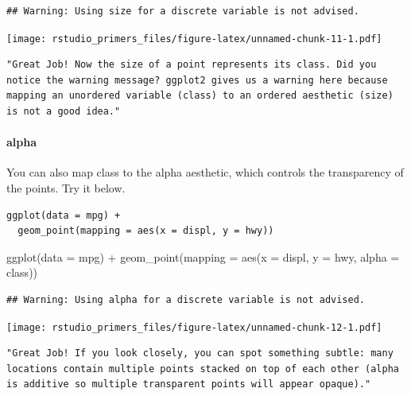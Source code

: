 \documentclass[
]{article}
\newenvironment{Shaded}{\begin{snugshade}}{\end{snugshade}}
\newcommand{\AttributeTok}[1]{\textcolor[rgb]{0.77,0.63,0.00}{#1}}
\newcommand{\FunctionTok}[1]{\textcolor[rgb]{0.00,0.00,0.00}{#1}}
\newcommand{\NormalTok}[1]{#1}
\newcommand{\SpecialCharTok}[1]{\textcolor[rgb]{0.00,0.00,0.00}{#1}}
\begin{document}
\begin{verbatim}
## Warning: Using size for a discrete variable is not advised.
\end{verbatim}

\texttt{[image: rstudio\_primers\_files/figure-latex/unnamed-chunk-11-1.pdf]}

\begin{verbatim}
"Great Job! Now the size of a point represents its class. Did you notice the warning message? ggplot2 gives us a warning here because mapping an unordered variable (class) to an ordered aesthetic (size) is not a good idea."
\end{verbatim}

\hypertarget{alpha}{%
\paragraph{alpha}\label{alpha}}

You can also map class to the alpha aesthetic, which controls the
transparency of the points. Try it below.

\begin{verbatim}
ggplot(data = mpg) + 
  geom_point(mapping = aes(x = displ, y = hwy))
\end{verbatim}

\begin{Shaded}
\begin{Highlighting}[]
  \FunctionTok{ggplot}\NormalTok{(}\AttributeTok{data =}\NormalTok{ mpg) }\SpecialCharTok{+} 
    \FunctionTok{geom\_point}\NormalTok{(}\AttributeTok{mapping =} \FunctionTok{aes}\NormalTok{(}\AttributeTok{x =}\NormalTok{ displ, }\AttributeTok{y =}\NormalTok{ hwy, }\AttributeTok{alpha =}\NormalTok{ class))}
\end{Highlighting}
\end{Shaded}

\begin{verbatim}
## Warning: Using alpha for a discrete variable is not advised.
\end{verbatim}

\texttt{[image: rstudio\_primers\_files/figure-latex/unnamed-chunk-12-1.pdf]}

\begin{verbatim}
"Great Job! If you look closely, you can spot something subtle: many locations contain multiple points stacked on top of each other (alpha is additive so multiple transparent points will appear opaque)."
\end{verbatim}
\end{document}

